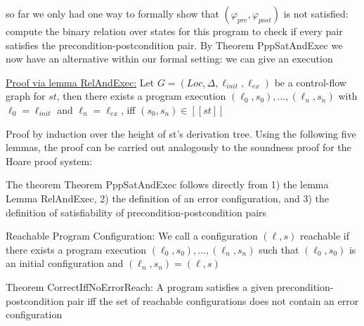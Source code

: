 \documentclass[landscape, a4paper]{article}
\begin{document}
\begin{minipage}[t]{0.2\linewidth}
\begin{betterlist}
		\begin{betterlist}
			\item so far we only had one way to formally show that $(\varphi_{pre}, \varphi_{post})$ is not satisfied: compute the binary relation over states for this program to check if every pair satisfies the precondition-postcondition pair. By Theorem PppSatAndExec we now have an alternative within our formal setting: we can give an execution
			\item {}
			\item \underline{Proof via lemma \alert{RelAndExec}:} Let $G = (Loc, \Delta, \ell_{init}, \ell_{ex})$ be a control-flow graph for $st$, then there exists a program execution $(\ell_0, s_0), . . . , (\ell_n, s_n)$ with $\ell_0 = \ell_{init}$ and $\ell_n = \ell_{ex}$, iff $(s_0, s_n) \in [[st]]$
			\begin{betterlist}
				\item Proof by induction over the height of st’s derivation tree. Using the following five lemmas, the proof can be carried out analogously to the soundness proof for the Hoare proof system:
				\begin{betterlist}
					\item {}
					\item {}
					\item {}
					\item {}
				\end{betterlist}
			\end{betterlist}
			\item The theorem Theorem PppSatAndExec follows directly from 1) the lemma Lemma RelAndExec, 2) the definition of an error configuration, and 3) the definition of satisfiability of precondition-postcondition pairs
		\end{betterlist}
		\item \alert{Reachable Program Configuration:} We call a configuration $(\ell, s)$ \alert{reachable} if there exists a program execution $(\ell_0, s_0), . . . , (\ell_n, s_n)$ such that $(\ell_0, s_0)$ is an initial configuration and $(\ell_n, s_n) = (\ell, s)$
		\item \alert{Theorem CorrectIffNoErrorReach:} A program satisfies a given precondition-postcondition pair iff the set of reachable configurations does not contain an error configuration

\end{betterlist}
\end{minipage}
\end{document}
